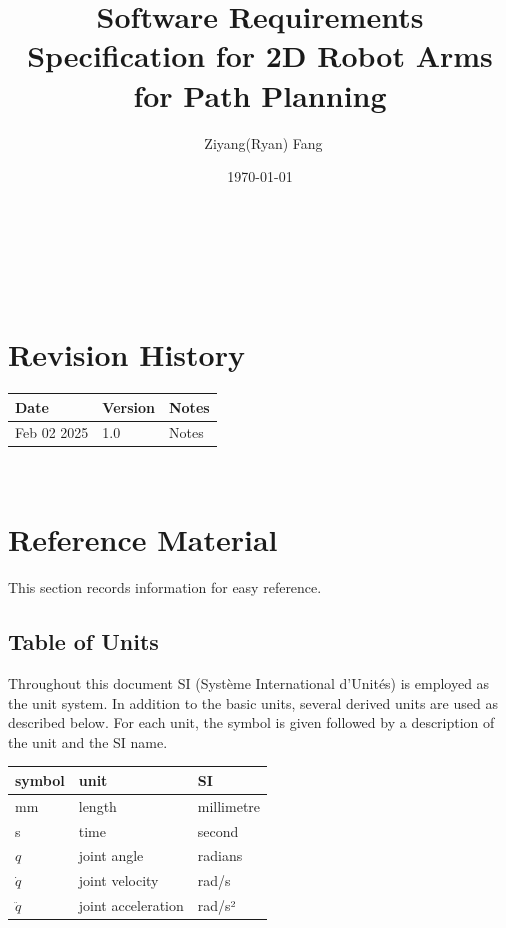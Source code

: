 \documentclass[12pt]{article}
\begin{document}
\title{Software Requirements Specification for 2D Robot Arms for Path Planning} 
\author{\ Ziyang(Ryan) Fang}
\date{\today}
	
\maketitle

~\newpage


\tableofcontents

~\newpage

\section*{Revision History}

\begin{tabularx}{\textwidth}{p{3cm}p{2cm}X}
\toprule {\bf Date} & {\bf Version} & {\bf Notes}\\
\midrule
Feb 02 2025 & 1.0 & Notes\\
\bottomrule
\end{tabularx}



~\newpage

\section{Reference Material}

This section records information for easy reference.

\subsection{Table of Units}

Throughout this document SI (Syst\`{e}me International d'Unit\'{e}s) is employed
as the unit system.  In addition to the basic units, several derived units are
used as described below.  For each unit, the symbol is given followed by a
description of the unit and the SI name.
~\newline

\renewcommand{\arraystretch}{1.2}
  \noindent \begin{tabular}{l l l} 
    \toprule		
    \textbf{symbol} & \textbf{unit} & \textbf{SI}\\
    \midrule 
    \si{\milli\metre} & length & millimetre \\
    \si{\second} & time & second \\
    \( q \) & joint angle & radians \\
    \(\dot{q}\) & joint velocity & rad/s \\
    \(\ddot{q}\) & joint acceleration & rad/s² \\
    \bottomrule
  \end{tabular}
\end{document}
